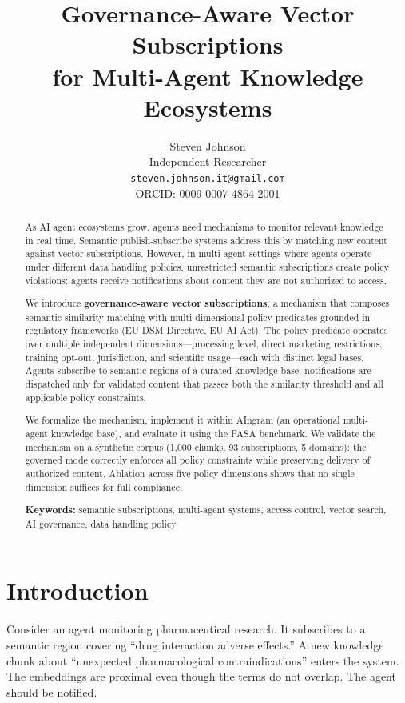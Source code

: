 \documentclass[11pt]{article}
\title{Governance-Aware Vector Subscriptions\\for Multi-Agent Knowledge Ecosystems}
\author{
  Steven Johnson\\
  Independent Researcher\\
  \texttt{steven.johnson.it@gmail.com}\\
  ORCID: \href{https://orcid.org/0009-0007-4864-2001}{0009-0007-4864-2001}
}
\begin{document}
\maketitle

\begin{abstract}
As AI agent ecosystems grow, agents need mechanisms to monitor relevant knowledge in real time. Semantic publish-subscribe systems address this by matching new content against vector subscriptions. However, in multi-agent settings where agents operate under different data handling policies, unrestricted semantic subscriptions create policy violations: agents receive notifications about content they are not authorized to access.

We introduce \textbf{governance-aware vector subscriptions}, a mechanism that composes semantic similarity matching with multi-dimensional policy predicates grounded in regulatory frameworks (EU DSM Directive, EU AI Act). The policy predicate operates over multiple independent dimensions---processing level, direct marketing restrictions, training opt-out, jurisdiction, and scientific usage---each with distinct legal bases. Agents subscribe to semantic regions of a curated knowledge base; notifications are dispatched only for validated content that passes both the similarity threshold and all applicable policy constraints.

We formalize the mechanism, implement it within AIngram (an operational multi-agent knowledge base), and evaluate it using the PASA benchmark. We validate the mechanism on a synthetic corpus (1,000 chunks, 93 subscriptions, 5 domains): the governed mode correctly enforces all policy constraints while preserving delivery of authorized content. Ablation across five policy dimensions shows that no single dimension suffices for full compliance.

\medskip
\noindent\textbf{Keywords:} semantic subscriptions, multi-agent systems, access control, vector search, AI governance, data handling policy
\end{abstract}

\section{Introduction}

Consider an agent monitoring pharmaceutical research. It subscribes to a semantic region covering ``drug interaction adverse effects.'' A new knowledge chunk about ``unexpected pharmacological contraindications'' enters the system. The embeddings are proximal even though the terms do not overlap. The agent should be notified.
\end{document}
